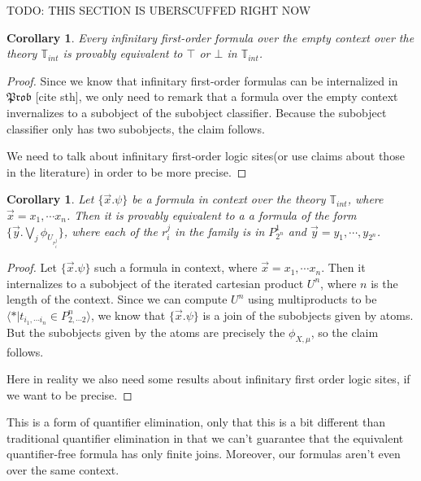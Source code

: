\documentclass[a4paper]{amsproc}
\theoremstyle{plain}
\newtheorem{corollary}[theorem]{Corollary}
\theoremstyle{definition}
\theoremstyle{remark}
\numberwithin{equation}{section}
\begin{document}
TODO: THIS SECTION IS UBERSCUFFED RIGHT NOW
\begin{corollary}
Every infinitary first-order formula over the empty context over the theory $\mathbb{T}_{int}$ is provably equivalent to $\top$ or $\bot$ in $\mathbb{T}_{int}$.
\end{corollary}
\begin{proof}
    Since we know that infinitary first-order formulas can be internalized in $\mathfrak{Prob}$ [cite sth], we only need to remark that a formula over the empty context invernalizes to a subobject of the subobject classifier. Because the subobject classifier only has two subobjects, the claim follows.
    
    We need to talk about infinitary first-order logic sites(or use claims about those in the literature) in order to be more precise.
\end{proof}

\begin{corollary}
    Let $\{ \vec{x} . \psi\}$ be a formula in context over the theory $\mathbb{T}_{int}$, where $\vec{x} = x_1, \cdots x_n$. Then it is provably equivalent to a a formula of the form $\{\vec{y} . \bigvee_j \phi_{U_{r_i^j}} \}$, where each of the $r_i^j$ in the family is in $P^1_{2^n}$ and $\vec{y} = y_1,\cdots,y_{2^n}$.
\end{corollary}
\begin{proof}
    Let $\{ \vec{x} . \psi\}$ such a formula in context, where $\vec{x} = x_1, \cdots x_n$. Then it internalizes to a subobject of the iterated cartesian product $U^n$, where $n$ is the length of the context. Since we can compute $U^n$ using multiproducts to be $\langle * | t_{i_1,\cdots i_n} \in P^n_{2,\cdots 2} \rangle$, we know that $\{ \vec{x} . \psi\}$ is a join of the subobjects given by atoms. But the subobjects given by the atoms are precisely the $\phi_{X,\mu}$, so the claim follows.

    Here in reality we also need some results about infinitary first order logic sites, if we want to be precise.
\end{proof}

This is a form of quantifier elimination, only that this is a bit different than traditional quantifier elimination in that we can't guarantee that the equivalent quantifier-free formula has only finite joins. Moreover, our formulas aren't even over the same context.
\end{document}
